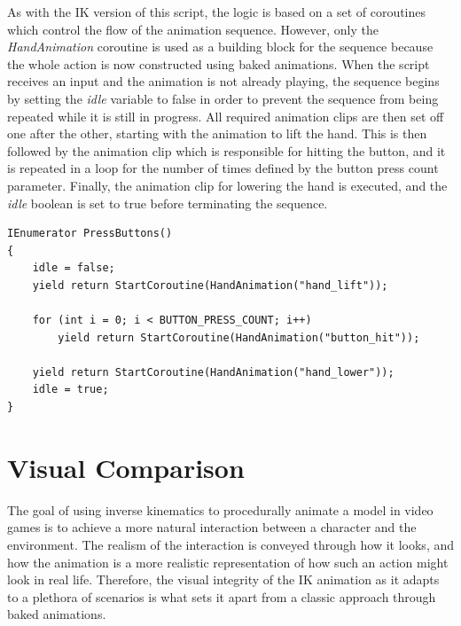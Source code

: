 As with the IK version of this script, the logic is based on a set of coroutines
which control the flow of the animation sequence. However, only the
\textit{HandAnimation} coroutine is used as a building block for the sequence
because the whole action is now constructed using baked animations. When the
script receives an input and the animation is not already playing, the sequence
begins by setting the \textit{idle} variable to false in order to prevent the sequence
from being repeated while it is still in progress. All required animation clips
are then set off one after the other, starting with the animation to lift the
hand. This is then followed by the animation clip which is responsible for
hitting the button, and it is repeated in a loop for the number of times defined
by the button press count parameter. Finally, the animation clip for lowering
the hand is executed, and the \textit{idle} boolean is set to true before
terminating the sequence.

\begin{lstlisting}[basicstyle=\footnotesize, numbers=none,frame=single,
caption={The main coroutine which plays the full animation sequence for the
baked version of the human character. The \textit{HandAnimation} coroutine is
analogous to the one used for the IK character in Listing \ref{first_coroutine}.
\textit{PressButton.cs}},captionpos=b, label=set_float,
language={[Sharp]c}, float=tp]
IEnumerator PressButtons()
{
    idle = false;
    yield return StartCoroutine(HandAnimation("hand_lift"));
    
    for (int i = 0; i < BUTTON_PRESS_COUNT; i++)
        yield return StartCoroutine(HandAnimation("button_hit"));
    
    yield return StartCoroutine(HandAnimation("hand_lower"));
    idle = true;
}
\end{lstlisting}

\section{Visual Comparison}
The goal of using inverse kinematics to procedurally animate a model in video
games is to achieve a more natural interaction between a character and the
environment. The realism of the interaction is conveyed through how it looks,
and how the animation is a more realistic representation of how such an action
might look in real life. Therefore, the visual integrity of the IK animation as
it adapts to a plethora of scenarios is what sets it apart from a classic
approach through baked animations. 

